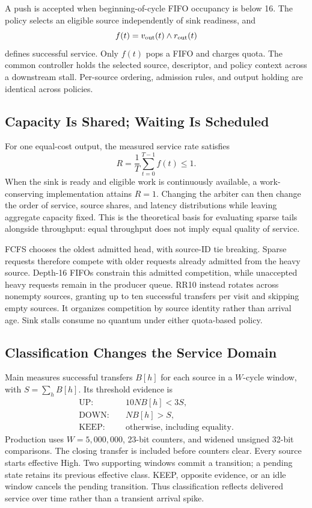

A push is accepted when beginning-of-cycle FIFO occupancy is below 16.
The policy selects an eligible source independently of sink readiness, and
\begin{equation}
 f(t)=v_{\rm out}(t)\land r_{\rm out}(t)
 \label{eq:fire}
\end{equation}
defines successful service. Only $f(t)$ pops a FIFO and charges quota. The common
controller holds the selected source, descriptor, and policy context across a
downstream stall. Per-source ordering, admission rules, and output holding are
identical across policies.

\subsection{Capacity Is Shared; Waiting Is Scheduled}
For one equal-cost output, the measured service rate satisfies
\begin{equation}
 R=\frac{1}{T}\sum_{t=0}^{T-1}f(t)\leq 1.
 \label{eq:capacity}
\end{equation}
When the sink is ready and eligible work is continuously available, a
work-conserving implementation attains $R=1$. Changing the arbiter can then
change the order of service, source shares, and latency distributions while
leaving aggregate capacity fixed. This is the theoretical basis for evaluating
sparse tails alongside throughput: equal throughput does not imply equal
quality of service.

FCFS chooses the oldest admitted head, with source-ID tie breaking. Sparse
requests therefore compete with older requests already admitted from the heavy
source. Depth-16 FIFOs constrain this admitted competition, while unaccepted
heavy requests remain in the producer queue. RR10 instead rotates across
nonempty sources, granting up to ten successful transfers per visit and skipping
empty sources. It organizes competition by source identity rather than arrival
age. Sink stalls consume no quantum under either quota-based policy.

\subsection{Classification Changes the Service Domain}
Main measures successful transfers $B[h]$ for each source in a $W$-cycle window,
with $S=\sum_h B[h]$. Its threshold evidence is
\begin{align}
 \mathrm{UP}:&\quad 10NB[h]<3S,\nonumber\\
 \mathrm{DOWN}:&\quad NB[h]>S,\label{eq:classes}\\
 \mathrm{KEEP}:&\quad \text{otherwise, including equality}.\nonumber
\end{align}
Production uses $W=5{,}000{,}000$, 23-bit counters, and widened unsigned 32-bit
comparisons. The closing transfer is included before counters clear. Every
source starts effective High. Two supporting windows commit a transition;
a pending state retains its previous effective class. KEEP, opposite evidence,
or an idle window cancels the pending transition. Thus classification reflects
delivered service over time rather than a transient arrival spike.

